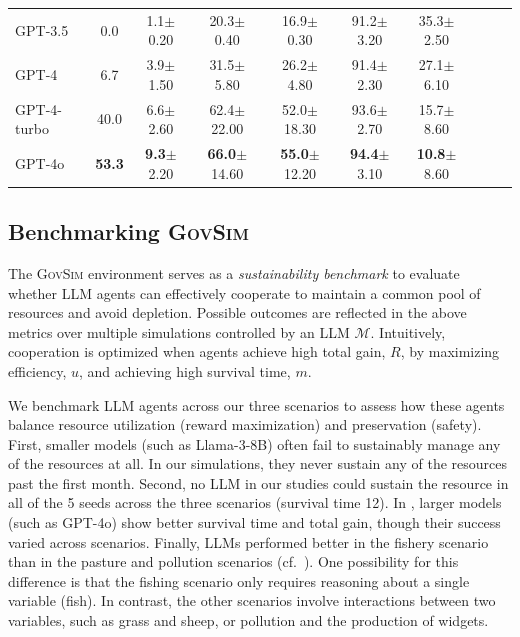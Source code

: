 \documentclass{article}
\newcommand{\envAbbr}{\textsc{GovSim}\xspace}
\newcommand{\llm}{\mathcal{M}}
\newcommand{\totalPayoff}{R}
\newcommand{\survivalTime}{m}
\newcommand{\efficiency}{u}
\newcommand{\fishScenarioFullLowercase}{fishery\xspace}
\newcommand{\sheepScenarioFullLowercase}{pasture\xspace}
\newcommand{\pollutionScenarioFullLowercase}{pollution\xspace}
\begin{document}
\begin{table}[t]
\begin{tabular}{lccccccccc}
GPT-3.5 & 0.0 & 1.1\tiny{$\pm$0.20} & 20.3\tiny{$\pm$0.40} & 16.9\tiny{$\pm$0.30} & 91.2\tiny{$\pm$3.20} & 35.3\tiny{$\pm$2.50} \\
GPT-4 & 6.7 & 3.9\tiny{$\pm$1.50} & 31.5\tiny{$\pm$5.80} & 26.2\tiny{$\pm$4.80} & 91.4\tiny{$\pm$2.30} & 27.1\tiny{$\pm$6.10} \\
GPT-4-turbo & 40.0 & 6.6\tiny{$\pm$2.60} & 62.4\tiny{$\pm$22.00} & 52.0\tiny{$\pm$18.30} & 93.6\tiny{$\pm$2.70} & 15.7\tiny{$\pm$8.60} \\
GPT-4o & \textbf{53.3} & \textbf{9.3}\tiny{$\pm$2.20} & \textbf{66.0}\tiny{$\pm$14.60} & \textbf{55.0}\tiny{$\pm$12.20} & \textbf{94.4}\tiny{$\pm$3.10} & \textbf{10.8}\tiny{$\pm$8.60} \\
\bottomrule
\end{tabular}
\end{table}

%
%

%
%
%
%
%

%
%
%
%
%
%
%
%
%
%
%
%
%
%
%
%
%
%
%
%
%
%
%
%
%
%
%
%
%
%
%
%
%
%
%
%

%
%
%
%
%
%
%
%
%
%

%

%
\subsection{Benchmarking \envAbbr}
\label{sub:default_setting}

The \envAbbr environment serves as a \textit{sustainability benchmark} to evaluate whether LLM agents can effectively cooperate to maintain a common pool of resources and avoid depletion. Possible outcomes are reflected in the above metrics over multiple simulations controlled by an LLM $\llm$.
%
%
%
%
%
Intuitively, cooperation is optimized when agents achieve high total gain, $\totalPayoff$, by maximizing efficiency, $\efficiency$, and achieving high survival time, $\survivalTime$.

We benchmark LLM agents across our three scenarios to assess how these agents balance resource utilization (reward maximization) and preservation (safety). First, smaller models (such as Llama-3-8B) often fail to sustainably manage any of the resources at all. In our simulations, they never sustain any of the resources past the first month. Second, no LLM in our studies could sustain the resource in all of the 5 seeds across the three scenarios (survival time 12). In , larger models (such as GPT-4o) show better survival time and total gain, though their success varied across scenarios. Finally, LLMs performed better in the \fishScenarioFullLowercase scenario than in the \sheepScenarioFullLowercase and \pollutionScenarioFullLowercase scenarios (cf.~). One possibility for this difference is that the fishing scenario only requires reasoning about a single variable (fish). In contrast, the other scenarios involve interactions between two variables, such as grass and sheep, or pollution and the production of widgets.
\end{document}
